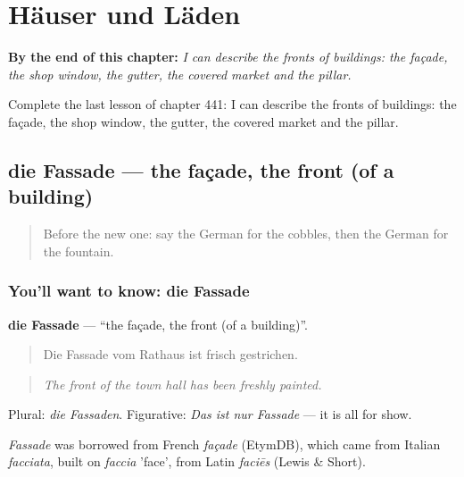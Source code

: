 
\chapter{Häuser und Läden}
\label{ch:ge-hauser-und-laden}

\begin{chapteropening}
\textbf{By the end of this chapter:} \emph{I can describe the fronts of buildings: the façade, the shop window, the gutter, the covered market and the pillar.}

Complete the last lesson of chapter 441: I can describe the fronts of buildings: the façade, the shop window, the gutter, the covered market and the pillar.
\end{chapteropening}

\section[die Fassade]{die Fassade — the façade, the front (of a building)}

\label{lesson:GE-C441-fassade}



\begin{quote}
Before the new one: say the German for the cobbles, then the German for the fountain.
\end{quote}

\subsection*{You'll want to know: die Fassade}
\textbf{die Fassade} — \textquotedblleft{}the façade, the front (of a building)\textquotedblright{}.

\begin{quote}
Die Fassade vom Rathaus ist frisch gestrichen.
\end{quote}

\begin{quote}
\emph{The front of the town hall has been freshly painted.}
\end{quote}

Plural: \emph{die Fassaden}. Figurative: \emph{Das ist nur Fassade} — it is all for show.

\begin{cousinweb}
\emph{Fassade} was borrowed from French \emph{façade} (EtymDB), which came from Italian \emph{facciata}, built on \emph{faccia} 'face', from Latin \emph{faciēs} (Lewis \& Short).
\end{cousinweb}

